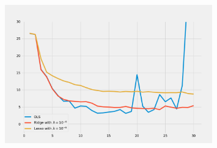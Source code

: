 \begin{figure}[H]
    \centering
    \includegraphics[width=0.8\textwidth]{Figures/g_ols_ridge_lasso_boots_n_20.png}
\end{figure}





